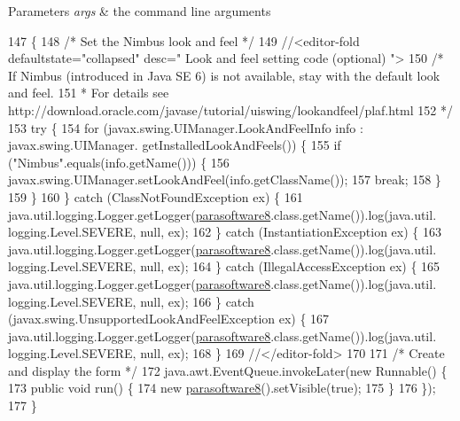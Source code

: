 \begin{DoxyParams}{Parameters}
{\em args} & the command line arguments \\
\hline
\end{DoxyParams}

\begin{DoxyCode}
147                                            \{
148         \textcolor{comment}{/* Set the Nimbus look and feel */}
149         \textcolor{comment}{//<editor-fold defaultstate="collapsed" desc=" Look and feel setting code (optional) ">}
150         \textcolor{comment}{/* If Nimbus (introduced in Java SE 6) is not available, stay with the default look and feel.}
151 \textcolor{comment}{         * For details see http://download.oracle.com/javase/tutorial/uiswing/lookandfeel/plaf.html }
152 \textcolor{comment}{         */}
153         \textcolor{keywordflow}{try} \{
154             \textcolor{keywordflow}{for} (javax.swing.UIManager.LookAndFeelInfo info : javax.swing.UIManager.
      getInstalledLookAndFeels()) \{
155                 \textcolor{keywordflow}{if} (\textcolor{stringliteral}{"Nimbus"}.equals(info.getName())) \{
156                     javax.swing.UIManager.setLookAndFeel(info.getClassName());
157                     \textcolor{keywordflow}{break};
158                 \}
159             \}
160         \} \textcolor{keywordflow}{catch} (ClassNotFoundException ex) \{
161             java.util.logging.Logger.getLogger(\mbox{\hyperlink{classsoftware_1_1parasoftware8_a0359e1d236b31fb9a86301dd11e12a7c}{parasoftware8}}.class.getName()).log(java.util.
      logging.Level.SEVERE, null, ex);
162         \} \textcolor{keywordflow}{catch} (InstantiationException ex) \{
163             java.util.logging.Logger.getLogger(\mbox{\hyperlink{classsoftware_1_1parasoftware8_a0359e1d236b31fb9a86301dd11e12a7c}{parasoftware8}}.class.getName()).log(java.util.
      logging.Level.SEVERE, null, ex);
164         \} \textcolor{keywordflow}{catch} (IllegalAccessException ex) \{
165             java.util.logging.Logger.getLogger(\mbox{\hyperlink{classsoftware_1_1parasoftware8_a0359e1d236b31fb9a86301dd11e12a7c}{parasoftware8}}.class.getName()).log(java.util.
      logging.Level.SEVERE, null, ex);
166         \} \textcolor{keywordflow}{catch} (javax.swing.UnsupportedLookAndFeelException ex) \{
167             java.util.logging.Logger.getLogger(\mbox{\hyperlink{classsoftware_1_1parasoftware8_a0359e1d236b31fb9a86301dd11e12a7c}{parasoftware8}}.class.getName()).log(java.util.
      logging.Level.SEVERE, null, ex);
168         \}
169         \textcolor{comment}{//</editor-fold>}
170 
171         \textcolor{comment}{/* Create and display the form */}
172         java.awt.EventQueue.invokeLater(\textcolor{keyword}{new} Runnable() \{
173             \textcolor{keyword}{public} \textcolor{keywordtype}{void} run() \{
174                 \textcolor{keyword}{new} \mbox{\hyperlink{classsoftware_1_1parasoftware8_a0359e1d236b31fb9a86301dd11e12a7c}{parasoftware8}}().setVisible(\textcolor{keyword}{true});
175             \}
176         \});
177     \}
\end{DoxyCode}


